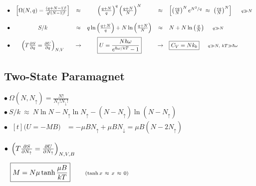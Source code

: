 \documentclass[12pt]{article}
\begin{document}
{\setlength{\arraycolsep}{5pt}
    \(\begin{array}{l c c c c l}
        \bullet & \left[ \Omega(N,q) = \tfrac{(q+N-1)!}{q! (N-1)!} \right] 
            &\approx& \left( \tfrac{q+N}{q} \right)^q \left( \tfrac{q+N}{N} \right)^N
            &\approx& \left[ \left( \frac{eq}{N} \right)^N e^{N^2/q} \ \approx \ 
                \left( \frac{eq}{N} \right)^N \right] \indent {\scriptstyle q \gg N}\\[15pt]
        \bullet & S/k 
            &\approx& q \ln \left( \tfrac{q+N}{q} \right) + N \ln \left( \tfrac{q+N}{N} \right)
            &\approx& N + N \ln{\left( \frac{q}{N} \right)} \indent {\scriptstyle q \gg N}\\[10pt]
        \bullet & \left( T \tfrac{\partial S}{\partial q} = \tfrac{\partial U}{\partial q} \right)_{N,V}
            &\rightarrow& \boxed{ U = \frac{N \hbar \omega}{e^{\hbar \omega / kT} - 1} } 
            &\rightarrow& \boxed{ C_V = N k_b } \indent {\scriptstyle q \gg N,\ kT \gg \hbar \omega}
    \end{array}\)
}

\subsection{Two-State Paramagnet}
\begin{minipage}[t]{.58\textwidth}
    \(\bullet \ \Omega(N, N_\uparrow) = \frac{N!}{N_\uparrow! N_\downarrow!}\)\\[10pt]
    \(\bullet \ S/k \ \approx \ N \ln{N} - N_\uparrow \ln{N_\uparrow} 
        - (N-N_\uparrow) \ln{(N-N_\uparrow)}\)\\[10pt]
    \(\bullet \ \begin{aligned}[t]
        \boxed{ \big( U = -MB \big) } &= -\mu B N_\uparrow + \mu B N_\downarrow = \mu B (N - 2N_\uparrow)
    \end{aligned}\)    
\end{minipage}
\begin{minipage}[t]{.4\textwidth}
    \(\bullet \ \begin{aligned}[t]
        &\left( T \tfrac{\partial S}{\partial N_\uparrow} 
            = \tfrac{\partial U}{\partial N_\uparrow} \right)_{N,V,B}\\[5pt]
        &\boxed{ M = N\mu \tanh{ \frac{\mu B}{k T} } }
            \hspace{.75cm} {\scriptstyle(\tanh{x}\ \approx\ x\ \approx\ 0)}
    \end{aligned}\)
\end{minipage}
\end{document}
